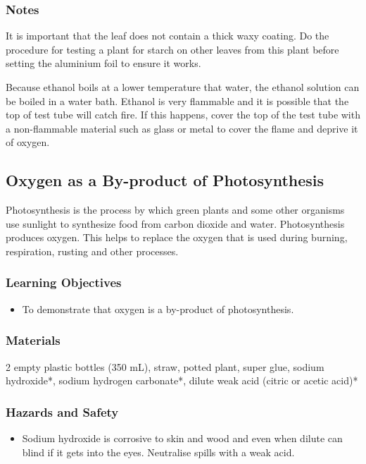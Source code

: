 \subsubsection*{Notes}
It is important that the leaf does not contain a thick waxy coating. Do the procedure for testing a plant for starch on other leaves from this plant before setting the aluminium foil to ensure it works.

Because ethanol boils at a lower temperature that water, the ethanol solution can be boiled in a water bath. Ethanol is very flammable and it is possible that the top of test tube will catch fire. If this happens, cover the top of the test tube with a non-flammable material such as glass or metal to cover the flame and deprive it of oxygen.

\subsection{Oxygen as a By-product of Photosynthesis}

Photosynthesis is the process by which green plants and some other organisms use sunlight to synthesize food from carbon dioxide and water. Photosynthesis produces oxygen. This helps to replace the oxygen that is used during burning, respiration, rusting and other processes.

\subsubsection*{Learning Objectives}
\begin{itemize}
\item{To demonstrate that oxygen is a by-product of photosynthesis.}
\end{itemize}

\subsubsection*{Materials}
2 empty plastic bottles (350 mL), straw, potted plant, super glue, sodium hydroxide*, sodium hydrogen carbonate*, dilute weak acid (citric or acetic acid)*

\subsubsection*{Hazards and Safety}
\begin{itemize}
\item{Sodium hydroxide is corrosive to skin and wood and even when dilute can blind if it gets into the eyes. Neutralise spills with a weak acid.}
\end{itemize}

